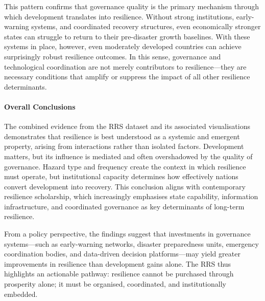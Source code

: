 \documentclass[conference]{IEEEtran}
\begin{document}
This pattern confirms that governance quality is the primary mechanism through which development translates into resilience. Without strong institutions, early-warning systems, and coordinated recovery structures, even economically stronger states can struggle to return to their pre-disaster growth baselines. With these systems in place, however, even moderately developed countries can achieve surprisingly robust resilience outcomes. In this sense, governance and technological coordination are not merely contributors to resilience—they are necessary conditions that amplify or suppress the impact of all other resilience determinants.

\paragraph{Overall Conclusions}
The combined evidence from the RRS dataset and its associated visualisations demonstrates that resilience is best understood as a systemic and emergent property, arising from interactions rather than isolated factors. Development matters, but its influence is mediated and often overshadowed by the quality of governance. Hazard type and frequency create the context in which resilience must operate, but institutional capacity determines how effectively nations convert development into recovery. This conclusion aligns with contemporary resilience scholarship, which increasingly emphasises state capability, information infrastructure, and coordinated governance as key determinants of long-term resilience.

From a policy perspective, the findings suggest that investments in governance systems—such as early-warning networks, disaster preparedness units, emergency coordination bodies, and data-driven decision platforms—may yield greater improvements in resilience than development gains alone. The RRS thus highlights an actionable pathway: resilience cannot be purchased through prosperity alone; it must be organised, coordinated, and institutionally embedded.
\end{document}

